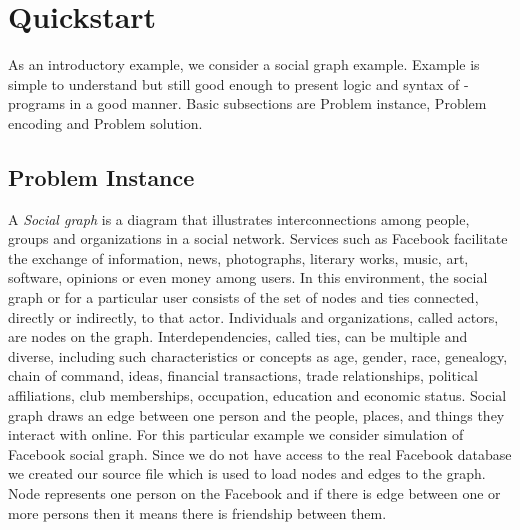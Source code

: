 \documentclass[14pt,a4paper, titlepage]{article}
\begin{document}
\section{Quickstart} %
As an introductory example, we consider a social graph example. Example is simple to understand  but still good enough to present logic and syntax of \hex{}-programs in a good manner. Basic subsections are Problem instance, Problem encoding and Problem solution.  

\subsection{Problem Instance}
A \emph{Social graph} is a diagram that illustrates interconnections among people, groups 
and organizations in a social network. Services such as Facebook facilitate the exchange 
of information, news, photographs, literary works, music, art, software, opinions or even 
money among users. In this environment, the social graph or for a particular user consists 
of the set of nodes and ties connected, directly or indirectly, to that actor. 
Individuals and organizations, called actors, are nodes on the graph. Interdependencies, 
called ties, can be multiple and diverse, including such characteristics or concepts as age, 
gender, race, genealogy, chain of command, ideas, financial transactions, trade relationships, 
political affiliations, club memberships, occupation, education and economic status. 
Social graph draws an edge between one person and the people, places, and things they interact 
with online. For this particular example we consider simulation of Facebook social graph. 
Since we do not have access to the real Facebook database we created our source file which is 
used to load nodes and edges to the graph. Node represents one person on the Facebook and if 
there is edge between one or more persons then it means there is friendship between them.  
\end{document}
